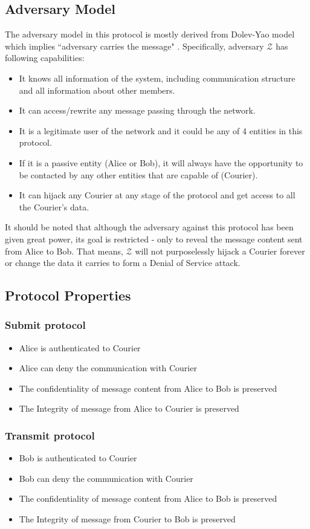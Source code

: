 \documentclass[10pt,a4paper]{article}
\begin{document}
\subsection*{Adversary Model}

The adversary model in this protocol is mostly derived from Dolev-Yao model which implies ``adversary carries the message" \cite{dolev}. Specifically, adversary $\mathcal{Z}$ has following capabilities:
\begin{itemize}
\item It knows all information of the system, including communication structure and all information about other members.
\item It can access/rewrite any message passing through the network.
\item It is a legitimate user of the network and it could be any of 4 entities in this protocol.
\item If it is a passive entity (Alice or Bob), it will always have the opportunity to be contacted by any other entities that are capable of (Courier).
\item It can hijack any Courier at any stage of the protocol and get access to all the Courier's data.
\end{itemize}
It should be noted that although the adversary against this protocol has been given great power, its goal is restricted - only to reveal the message content sent from Alice to Bob. That means, $\mathcal{Z}$ will not purposelessly hijack a Courier forever or change the data it carries to form a Denial of Service attack.

\subsection*{Protocol Properties}
\subsubsection*{Submit protocol}
\begin{itemize}
\item Alice is authenticated to Courier
\item Alice can deny the communication with Courier
\item The confidentiality of message content from Alice to Bob is preserved
\item The Integrity of message from Alice to Courier is preserved
\end{itemize}

\subsubsection*{Transmit protocol}
\begin{itemize}
\item Bob is authenticated to Courier
\item Bob can deny the communication with Courier
\item The confidentiality of message content from Alice to Bob is preserved
\item The Integrity of message from Courier to Bob is preserved
\end{itemize}
\end{document}

